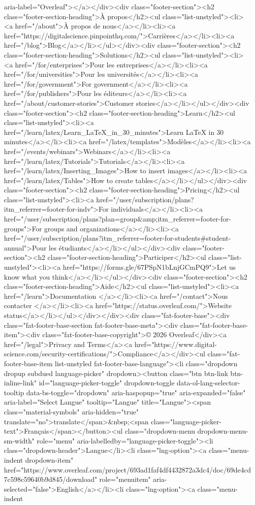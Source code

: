 aria-label="Overleaf"></a></div><div class="footer-section"><h2 class="footer-section-heading">À propos</h2><ul class="list-unstyled"><li><a href="/about">À propos de nous</a></li><li><a href="https://digitalscience.pinpointhq.com/">Carrières</a></li><li><a href="/blog">Blog</a></li></ul></div><div class="footer-section"><h2 class="footer-section-heading">Solutions</h2><ul class="list-unstyled"><li><a href="/for/enterprises">Pour les entreprises</a></li><li><a href="/for/universities">Pour les universités</a></li><li><a href="/for/government">For government</a></li><li><a href="/for/publishers">Pour les éditeurs</a></li><li><a href="/about/customer-stories">Customer stories</a></li></ul></div><div class="footer-section"><h2 class="footer-section-heading">Learn</h2><ul class="list-unstyled"><li><a href="/learn/latex/Learn_LaTeX_in_30_minutes">Learn LaTeX in 30 minutes</a></li><li><a href="/latex/templates">Modèles</a></li><li><a href="/events/webinars">Webinars</a></li><li><a href="/learn/latex/Tutorials">Tutorials</a></li><li><a href="/learn/latex/Inserting_Images">How to insert images</a></li><li><a href="/learn/latex/Tables">How to create tables</a></li></ul></div><div class="footer-section"><h2 class="footer-section-heading">Pricing</h2><ul class="list-unstyled"><li><a href="/user/subscription/plans?itm_referrer=footer-for-indv">For individuals</a></li><li><a href="/user/subscription/plans?plan=group&amp;itm_referrer=footer-for-groups">For groups and organizations</a></li><li><a href="/user/subscription/plans?itm_referrer=footer-for-students#student-annual">Pour les étudiants</a></li></ul></div><div class="footer-section"><h2 class="footer-section-heading">Participer</h2><ul class="list-unstyled"><li><a href="https://forms.gle/67PSpN1bLnjGCmPQ9">Let us know what you think</a></li></ul></div><div class="footer-section"><h2 class="footer-section-heading">Aide</h2><ul class="list-unstyled"><li><a href="/learn">Documentation </a></li><li><a href="/contact">Nous contacter </a></li><li><a href="https://status.overleaf.com/">Website status</a></li></ul></div></div><div class="fat-footer-base"><div class="fat-footer-base-section fat-footer-base-meta"><div class="fat-footer-base-item"><div class="fat-footer-base-copyright">© 2026 Overleaf</div><a href="/legal">Privacy and Terms</a><a href="https://www.digital-science.com/security-certifications/">Compliance</a></div><ul class="fat-footer-base-item list-unstyled fat-footer-base-language"><li class="dropdown dropup subdued language-picker" dropdown><button class="btn btn-link btn-inline-link" id="language-picker-toggle" dropdown-toggle data-ol-lang-selector-tooltip data-bs-toggle="dropdown" aria-haspopup="true" aria-expanded="false" aria-label="Select Langue" tooltip="Langue" title="Langue"><span class="material-symbols" aria-hidden="true" translate="no">translate</span>&nbsp;<span class="language-picker-text">Français</span></button><ul class="dropdown-menu dropdown-menu-sm-width" role="menu" aria-labelledby="language-picker-toggle"><li class="dropdown-header">Langue</li><li class="lng-option"><a class="menu-indent dropdown-item" href="https://www.overleaf.com/project/693ad1faf4df4432872a3dc4/doc/69de4cd7c598c59640b9d845/download" role="menuitem" aria-selected="false">English</a></li><li class="lng-option"><a class="menu-indent 
